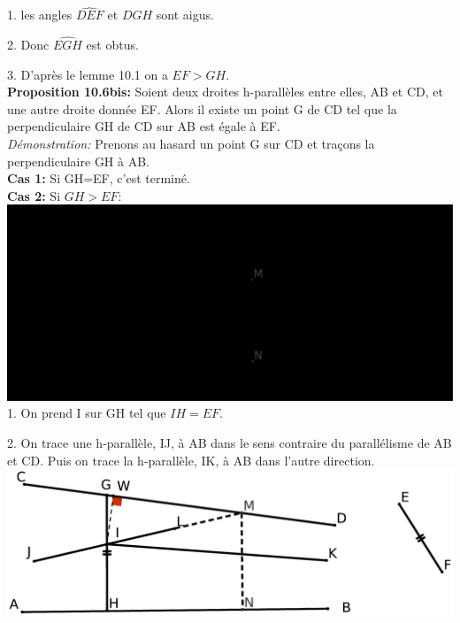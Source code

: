 \documentclass[a4paper, 12pt, twoside]{book}
\begin{document}
  
   
  1. les angles $\hat{DEF}$ et $\hat{DGH}$ sont aigus.\
  
  2. Donc $\hat{EGH}$ est obtus.\
  
  3. D'après le lemme 10.1 on a $EF>GH$.\\
  
 \newpage \textbf{Proposition 10.6bis:} Soient deux droites h-parallèles entre elles, AB et CD, et une autre droite donnée EF. Alors il existe un point G de CD tel que la perpendiculaire GH de CD sur AB est égale à EF.\\
 
 \textit{Démonstration:} Prenons au hasard un point G sur CD et traçons la perpendiculaire GH à AB.\\
 
 \textbf{Cas 1:} Si GH=EF, c'est terminé.\\
 
  \textbf{Cas 2:} Si $GH>EF$:\\
 
 
   
  \includegraphics[scale=0.2]{figures/Lobat10.eps}\\
  
  1. On prend I sur GH tel que $IH=EF$.\
  
  2. On trace une h-parallèle, IJ, à AB dans le sens contraire du parallélisme de AB et CD. Puis on trace la h-parallèle, IK, à AB dans l'autre direction.\\
  
   \includegraphics[scale=0.2]{figures/Lobat10bis.eps}\\
  
\end{document}
